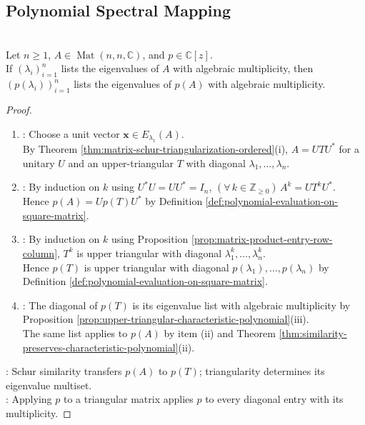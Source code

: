\subsection{Polynomial Spectral Mapping}

\begin{proposition} \label{prop:eigenvalues-of-polynomial-in-matrix} \\
Let $n\geq1$, $A\in\operatorname{Mat}(n,n,\mathbb{C})$, and $p\in\mathbb{C}[z]$.\\
If $(\lambda_i)_{i=1}^{n}$ lists the eigenvalues of $A$ with algebraic multiplicity, then $(p(\lambda_i))_{i=1}^{n}$ lists the eigenvalues of $p(A)$ with algebraic multiplicity.
\begin{proof}
\begin{enumerate}[label=(\roman*)]
\setlength{\itemsep}{0pt}
\item {}: Choose a unit vector $\mathbf{x}\in E_{\lambda_1}(A)$.\\
By Theorem \ref{thm:matrix-schur-triangularization-ordered}(i), $A=UTU^*$ for a unitary $U$ and an upper-triangular $T$ with diagonal $\lambda_1,\ldots,\lambda_n$.
\item {}: By induction on $k$ using $U^*U=UU^*=I_n$, $(\forall\,k\in\mathbb{Z}_{\geq0})\,A^k=UT^kU^*$.\\
Hence $p(A)=Up(T)U^*$ by Definition \ref{def:polynomial-evaluation-on-square-matrix}.
\item {}: By induction on $k$ using Proposition \ref{prop:matrix-product-entry-row-column}, $T^k$ is upper triangular with diagonal $\lambda_1^k,\ldots,\lambda_n^k$.\\
Hence $p(T)$ is upper triangular with diagonal $p(\lambda_1),\ldots,p(\lambda_n)$ by Definition \ref{def:polynomial-evaluation-on-square-matrix}.
\item {}: The diagonal of $p(T)$ is its eigenvalue list with algebraic multiplicity by Proposition \ref{prop:upper-triangular-characteristic-polynomial}(iii).\\
The same list applies to $p(A)$ by item (ii) and Theorem \ref{thm:similarity-preserves-characteristic-polynomial}(ii).
\end{enumerate}
: Schur similarity transfers $p(A)$ to $p(T)$; triangularity determines its eigenvalue multiset.\\
: Applying $p$ to a triangular matrix applies $p$ to every diagonal entry with its multiplicity.
\end{proof}
\end{proposition}

